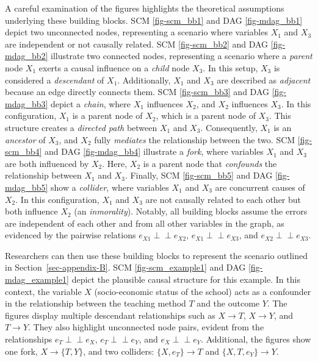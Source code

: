 \documentclass[
  authoryear,
  review,
  1p]{elsarticle}
\begin{document}
A careful examination of the figures highlights the theoretical
assumptions underlying these building blocks. SCM \ref{fig-scm_bb1} and
DAG \ref{fig-mdag_bb1} depict two unconnected nodes, representing a
scenario where variables \(X_{1}\) and \(X_{3}\) are independent or not
causally related. SCM \ref{fig-scm_bb2} and DAG \ref{fig-mdag_bb2}
illustrate two connected nodes, representing a scenario where a
\emph{parent} node \(X_{1}\) exerts a causal influence on a \emph{child}
node \(X_{3}\). In this setup, \(X_{3}\) is considered a
\emph{descendant} of \(X_{1}\). Additionally, \(X_{1}\) and \(X_{3}\)
are described as \emph{adjacent} because an edge directly connects them.
SCM \ref{fig-scm_bb3} and DAG \ref{fig-mdag_bb3} depict a \emph{chain},
where \(X_{1}\) influences \(X_{2}\), and \(X_{2}\) influences
\(X_{3}\). In this configuration, \(X_{1}\) is a parent node of
\(X_{2}\), which is a parent node of \(X_{3}\). This structure creates a
\emph{directed path} between \(X_{1}\) and \(X_{3}\). Consequently,
\(X_{1}\) is an \emph{ancestor} of \(X_{3}\), and \(X_{2}\) fully
\emph{mediates} the relationship between the two. SCM \ref{fig-scm_bb4}
and DAG \ref{fig-mdag_bb4} illustrate a \emph{fork}, where variables
\(X_{1}\) and \(X_{3}\) are both influenced by \(X_{2}\). Here,
\(X_{2}\) is a parent node that \emph{confounds} the relationship
between \(X_{1}\) and \(X_{3}\). Finally, SCM \ref{fig-scm_bb5} and DAG
\ref{fig-mdag_bb5} show a \emph{collider}, where variables \(X_{1}\) and
\(X_{3}\) are concurrent causes of \(X_{2}\). In this configuration,
\(X_{1}\) and \(X_{3}\) are not causally related to each other but both
influence \(X_{2}\) (an \emph{inmorality}). Notably, all building blocks
assume the errors are independent of each other and from all other
variables in the graph, as evidenced by the pairwise relations
\(e_{X1} \perp\!\!\!\perp e_{X2}\), \(e_{X1} \perp\!\!\!\perp e_{X3}\),
and \(e_{X2} \perp\!\!\!\perp e_{X3}\).

Researchers can then use these building blocks to represent the scenario
outlined in Section~\ref{sec-appendix-B}. SCM \ref{fig-scm_example1} and
DAG \ref{fig-mdag_example1} depict the plausible causal structure for
this example. In this context, the variable \(X\) (socio-economic status
of the school) acts as a confounder in the relationship between the
teaching method \(T\) and the outcome \(Y\). The figures display
multiple descendant relationships such as \(X \rightarrow T\),
\(X \rightarrow Y\), and \(T \rightarrow Y\). They also highlight
unconnected node pairs, evident from the relationships
\(e_{T} \perp\!\!\!\perp e_{X}\), \(e_{T} \perp\!\!\!\perp e_{Y}\), and
\(e_{X} \perp\!\!\!\perp e_{Y}\). Additional, the figures show one fork,
\(X \rightarrow \{T, Y\}\), and two colliders:
\(\{X, e_{T}\} \rightarrow T\) and \(\{X, T, e_{Y}\} \rightarrow Y\).
\end{document}
